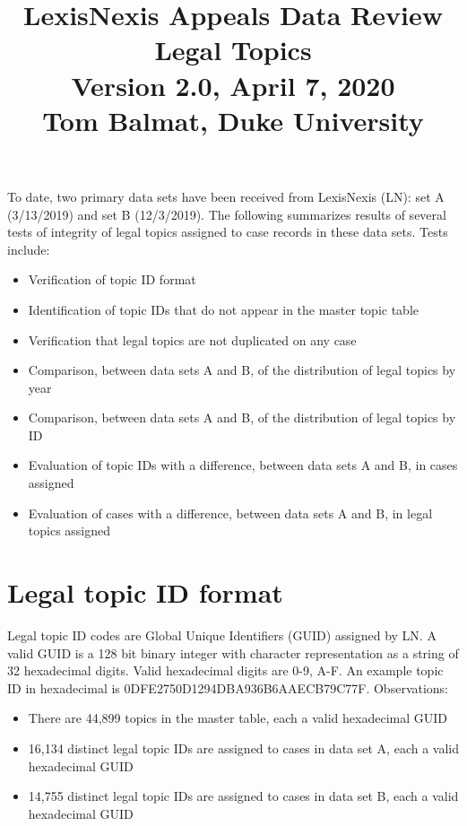 \documentclass[10pt, letterpaper]{article}
\title{\vspace{-0.5in}\large LexisNexis Appeals Data Review\\[4pt]Legal Topics\\[4pt]
       \normalsize Version 2.0, April 7, 2020\\[4pt]Tom Balmat, Duke University\\[-20pt]}
\date{}
\begin{document}
    
\begin{spacing}{1.0}

\maketitle

To date, two primary data sets have been received from LexisNexis (LN):  set A (3/13/2019) and set B (12/3/2019).  The following summarizes results of several tests of integrity of legal topics assigned to case records in these data sets.  Tests include:

\begin{itemize}\setlength\itemsep{1pt}
    \item Verification of topic ID format
    \item Identification of topic IDs that do not appear in the master topic table
    \item Verification that legal topics are not duplicated on any case
    \item Comparison, between data sets A and B, of the distribution of legal topics by year
    \item Comparison, between data sets A and B, of the distribution of legal topics by ID
    \item Evaluation of topic IDs with a difference, between data sets A and B, in cases assigned 
    \item Evaluation of cases with a difference, between data sets A and B, in legal topics assigned
\end{itemize} 


\section*{Legal topic ID format}

Legal topic ID codes are Global Unique Identifiers (GUID) assigned by LN.  A valid GUID is a 128 bit binary integer with character representation as a string of 32 hexadecimal digits.  Valid hexadecimal digits are 0-9, A-F.  An example topic ID in hexadecimal is 0DFE2750D1294DBA936B6AAECB79C77F.  Observations:

\begin{itemize}\setlength\itemsep{1pt}
    \item There are 44,899 topics in the master table, each a valid hexadecimal GUID
    \item 16,134 distinct legal topic IDs are assigned to cases in data set A,  each a valid hexadecimal GUID
    \item 14,755 distinct legal topic IDs are assigned to cases in data set B, each a valid hexadecimal GUID
\end{itemize}


\end{spacing}
\end{document}
